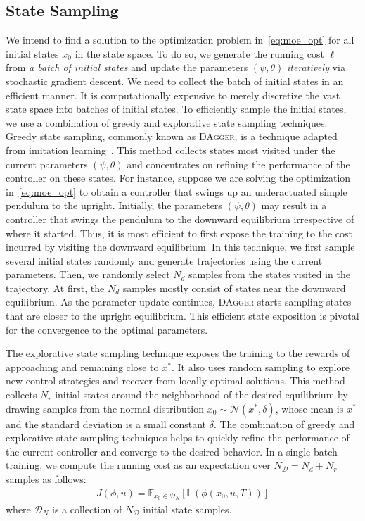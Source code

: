 \subsection{State Sampling}
\label{ssec:state_sampling}

We intend to find a solution to the optimization problem
in~\eqref{eq:moe_opt} for all initial states $x_0$ in the
state space.
%
To do so, we generate the running cost $\ell$ from \textit{a batch of initial
states} and update the parameters $(\psi, \theta)$ \textit{iteratively} via
stochastic gradient descent.
%
We need to collect the batch of initial states in an efficient manner.
%
It is computationally expensive to merely discretize the vast state
space into batches of initial states. 
%
To efficiently sample the initial states, we use a combination of greedy and
explorative state sampling techniques.
%
Greedy state sampling, commonly known as \textsc{DAgger}, is a technique
adapted from imitation learning~\cite{ross2011no}.
%
This method collects states most visited under the current parameters $(\psi,
\theta)$ and concentrates on refining the performance of the controller on these
states.
%
For instance, suppose we are solving the optimization in~\eqref{eq:moe_opt} to
obtain a controller that swings up an underactuated simple pendulum to the
upright.
Initially, the parameters $(\psi, \theta)$ may result in a controller that swings the
pendulum to the downward equilibrium irrespective of where it started.
%
Thus, it is most efficient to first expose the training to the cost incurred by
visiting the downward equilibrium.
%
In this technique, we first sample several initial states randomly and generate
trajectories using the current parameters.
%
Then, we randomly select $N_d$ samples from the states visited in the trajectory. 
%
At first, the $N_d$ samples mostly consist of states near the downward equilibrium.
%
As the parameter update continues, \textsc{DAgger} starts sampling states that
are closer to the upright equilibrium.
%
This efficient state exposition is pivotal for the convergence to the optimal
parameters.



The explorative state sampling technique exposes the training to the rewards of approaching and 
remaining close to $x^*$.
%
It also uses random sampling to explore new control strategies and recover from locally optimal
solutions.  
%
This method collects $N_r$ initial states around the neighborhood of the desired
equilibrium by drawing samples from the normal distribution $x_0 \sim \mathcal{N}(x^*, \delta)$,
whose mean is $x^*$ and the standard deviation is a small constant $\delta$.
%
The combination of greedy and explorative state sampling techniques helps to
quickly refine the performance of the current controller and converge to the desired behavior.
%
In a single batch training, we compute the running cost as an expectation
over $N_{\mathcal{D}} = N_d+N_r$ samples as follows:
\begin{align*}
    J(\phi, u) = \mathbb{E}_{x_0 \in \mathcal{D}_N}[ \mathbb{L}(\phi(x_0, u, T))]
\end{align*}
\noindent where $\mathcal{D}_N$ is a collection of $N_{\mathcal{D}}$ initial state samples.

